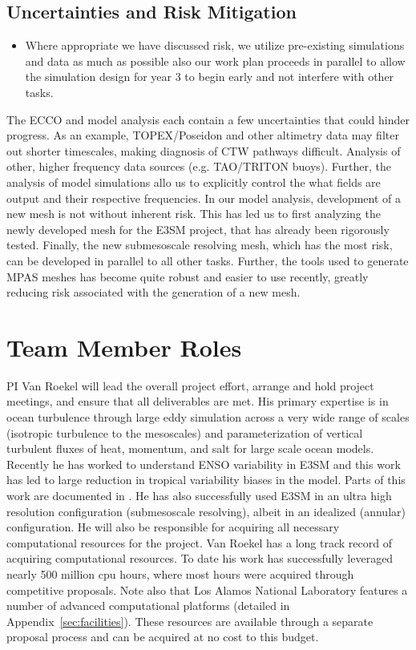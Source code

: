 \subsection{Uncertainties and Risk Mitigation}
\color{red}
\begin{itemize}
    \item Where appropriate we have discussed risk, we utilize pre-existing simulations and data as much as possible also our work plan proceeds in parallel to allow the simulation design for year 3 to begin early and not interfere with other tasks.
\end{itemize}
\color{black}

The ECCO and model analysis each contain a few uncertainties that could hinder progress.  As an example, TOPEX/Poseidon and other altimetry data may filter out shorter timescales, making diagnosis of CTW pathways difficult.  Analysis of other, higher frequency data sources (e.g. TAO/TRITON buoys).  Further, the analysis of model simulations allo us to explicitly control the what fields are output and their respective frequencies.  In our model analysis, development of a new mesh is not without inherent risk.  This has led us to first analyzing the newly developed mesh for the E3SM project, that has already been rigorously tested.  Finally, the new submesoscale resolving mesh, which has the most risk, can be developed in parallel to all other tasks.  Further, the tools used to generate MPAS meshes has become quite robust and easier to use recently, greatly reducing risk associated with the generation of a new mesh.

\section{Team Member Roles}

PI Van Roekel will lead the overall project effort, arrange and hold project meetings, and ensure that all deliverables are met.  His primary expertise is in ocean turbulence through large eddy simulation across a very wide range of scales (isotropic turbulence to the mesoscales) and parameterization of vertical turbulent fluxes of heat, momentum, and salt for large scale ocean models.  Recently he has worked to understand ENSO variability in E3SM and this work has led to large reduction in tropical variability biases in the model.  Parts of this work are documented in \citep{golaz2018doe}.  He has also successfully used E3SM in an ultra high resolution configuration (submesoscale resolving), albeit in an idealized (annular) configuration.  He will also be responsible for acquiring all necessary computational resources for the project.  Van Roekel has a long track record of acquiring computational resources.  To date his work has successfully leveraged nearly 500 million cpu hours, where most hours were acquired through competitive proposals.  Note also that Los Alamos National Laboratory features a number of advanced computational platforms (detailed in Appendix~\ref{sec:facilities}).  These resources are available through a separate proposal process and can be acquired at no cost to this budget.

